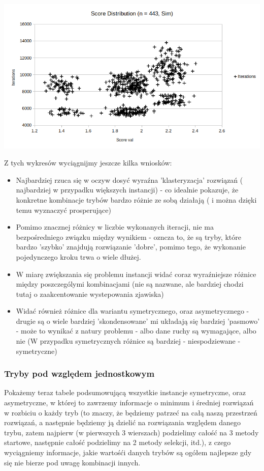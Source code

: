\documentclass{article}
\begin{document}
\includegraphics[scale=0.36]{asimDist443}

\newpage
Z tych wykresów wyciągnijmy jeszcze kilka wniosków:
\begin{itemize}
	\item Najbardziej rzuca się w oczyw dosyć wyraźna 'klasteryzacja' rozwiązań ( najbardziej w przypadku większych instancji) - co idealnie pokazuje, że konkretne kombinacje trybów bardzo różnie ze sobą działają ( i można dzięki temu wyznaczyć prosperujące)
	\item Pomimo znacznej różnicy w liczbie wykonanych iteracji, nie ma bezpośredniego związku między wynikiem - ozncza to, że są tryby, które bardzo 'szybko' znajdują rozwiązanie 'dobre', pomimo tego, że wykonanie pojedynczego kroku trwa o wiele dłużej.
	\item W miarę zwiększania się problemu instancji widać coraz wyraźniejsze różnice między poszczególymi kombinacjami (nie są nazwane, ale bardziej chodzi tutaj o zaakcentowanie wystepowania zjawiska)
	\item Widać również różnice dla wariantu symetrycznego, oraz asymetrycznego - drugie są o wiele bardziej 'skondensowane' mi układają się bardziej 'pasmowo' - może to wynikać z natury problemu - albo dane ruchy są wymagające, albo nie (W przypadku symetrycznych różnice są bardziej - niespodziewane - symetryczne)
\end{itemize}

\subsubsection{Tryby pod względem jednostkowym}
Pokażemy teraz tabele podsumowującą wszystkie instancje symetryczne, oraz asymetryczne, w której to zawrzemy informacje o minimum i średniej rozwiązań w rozbiciu o każdy tryb (to znaczy, że będziemy patrzeć na całą naszą przestrzeń rozwiązań, a następnie będziemy ją dzielić na rozwiązania względem danego trybu, zatem najpierw (w pierwszych 3 wierszach) podzielimy całość na 3 metody startowe, następnie całość podzielimy na 2 metody selekcji, itd.), z czego wyciągniemy informacje, jakie wartośći danych trybów są ogółem najlepsze gdy się nie bierze pod uwagę kombinacji innych.
\end{document}
